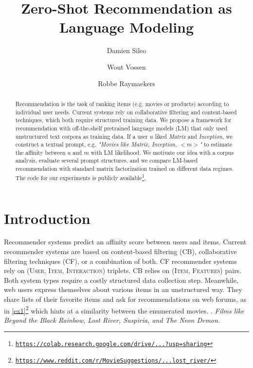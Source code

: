 \documentclass[runningheads]{llncs}
\begin{document}
\title{Zero-Shot Recommendation as Language Modeling}


\author{Damien Sileo \and
Wout Vossen \and
Robbe Raymaekers}







\maketitle

\begin{abstract}
Recommendation is the task of ranking items (e.g. movies or products) according to individual user needs. Current systems rely on collaborative filtering and content-based techniques, which both require structured training data. We propose a framework for recommendation with off-the-shelf pretrained language models (LM) that only used unstructured text corpora as training data. If a user $u$ liked \textit{Matrix} and \textit{Inception}, we construct a textual prompt, e.g. \textit{"Movies like Matrix, Inception, ${<}m{>}$"} to estimate the affinity between  $u$ and $m$ with LM likelihood. We motivate our idea with a corpus analysis, evaluate several prompt structures, and we compare LM-based recommendation with standard matrix factorization trained on different data regimes. The code for our experiments is publicly available\footnote{\href{https://colab.research.google.com/drive/1f1mlZ-FGaLGdo5rPzxf3vemKllbh2esT?usp=sharing}{\texttt{https://colab.research.google.com/drive/...?usp=sharing}}}.



\end{abstract}

\section{Introduction}
Recommender systems predict an affinity score between users and items. Current recommender systems are based on content-based filtering (CB),  collaborative filtering techniques (CF), or a combination of both.  CF recommender systems rely on (\textsc{User,  Item,  Interaction}) triplets.  CB relies on (\textsc{Item, Features}) pairs. Both system types require a costly structured data collection step.  Meanwhile, web users  express themselves about various items in an unstructured way. They share lists of their favorite items and ask for recommendations on web forums, as in \ref{ex1}\footnote{\href{https://www.reddit.com/r/MovieSuggestions/comments/cuuwrk/films_like_beyond_the_black_rainbow_lost_river/} {\texttt{https://www.reddit.com/r/MovieSuggestions/...lost\_river/}}} which hints at a similarity between the enumerated movies. 
\ex. \textit{\hspace{-0.3cm} Films like Beyond the Black Rainbow, Lost River, Suspiria, and The Neon Demon. \label{ex1}}
\end{document}

